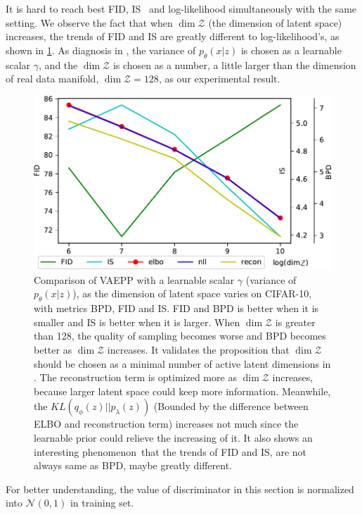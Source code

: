 It is hard to reach best FID, IS~\cite{salimans2016improved} and log-likelihood simultaneously with the same setting. We observe the fact that when $\dim \mathcal{Z}$ (the dimension of latent space) increases, the trends of FID and IS are greatly different to log-likelihood's, as shown in \cref{fig:fid_different_dim}. As diagnosis in \cite{dai2019diagnosing}, the variance of $p_\theta(x|z)$ is chosen as a learnable scalar $\gamma$, and the $\dim \mathcal{Z}$ is chosen as a number, a little larger than the dimension of real data manifold, $\dim \mathcal{Z} = 128$, as our experimental result.  

\begin{figure}[tb]
	\centering
	\includegraphics[width=0.9\columnwidth]{../dist.strip/z_dim}
	\caption{
	Comparison of VAEPP with a learnable scalar $\gamma$ (variance of $p_\theta(x|z)$), as the dimension of latent space varies on CIFAR-10, with metrics BPD, FID and IS. FID and BPD is better when it is smaller and IS is better when it is larger. When $\dim \mathcal{Z}$ is greater than 128, the quality of sampling becomes worse and BPD becomes better as $\dim \mathcal{Z}$ increases. It validates the proposition that $\dim \mathcal{Z}$ should be chosen as a minimal number of active latent dimensions in \protect\cite{dai2019diagnosing}. The reconstruction term is optimized more as $\dim \mathcal{Z}$ increases, because larger latent space could keep more information. Meanwhile, the $KL(q_\phi(z)||p_\lambda(z))$ (Bounded by the difference between ELBO and reconstruction term) increases not much since the learnable prior could relieve the increasing of it. It also shows an interesting phenomenon that the  trends of FID and IS, are not always same as BPD, maybe greatly different. 
	}
	\label{fig:fid_different_dim}
\end{figure}

For better understanding, the value of discriminator in this section is normalized into $\mathcal{N}(0, 1)$ in training set.

